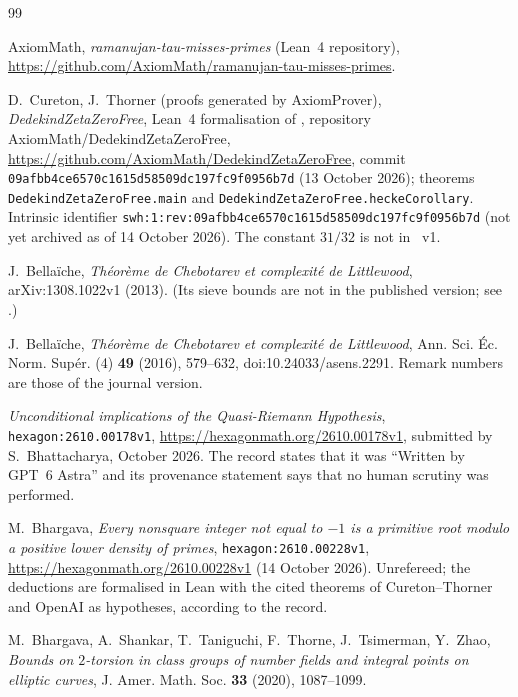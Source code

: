\documentclass[11pt]{amsart}
\theoremstyle{definition}
\theoremstyle{remark}
\begin{document}
\begin{thebibliography}{99}

AxiomMath, \emph{ramanujan-tau-misses-primes} (Lean~4 repository), \url{https://github.com/AxiomMath/ramanujan-tau-misses-primes}.

D.~Cureton, J.~Thorner (proofs generated by AxiomProver), \emph{DedekindZetaZeroFree}, Lean~4 formalisation of
\cite{CT}, repository AxiomMath/DedekindZetaZeroFree, \url{https://github.com/AxiomMath/DedekindZetaZeroFree}, commit
\texttt{09afbb4ce6570c1615d58509dc197fc9f0956b7d} (13 October 2026); theorems \texttt{DedekindZetaZeroFree.main} and
\texttt{DedekindZetaZeroFree.heckeCorollary}. Intrinsic identifier
\texttt{swh:1:rev:09afbb4ce6570c1615d58509dc197fc9f0956b7d} (not yet archived as of 14 October 2026). The constant
$31/32$ is not in \cite{CT}~v1.

J.~Bella\"iche, \emph{Th\'eor\`eme de Chebotarev et complexit\'e de Littlewood}, arXiv:1308.1022v1 (2013). (Its sieve bounds
are not in the published version; see \cite[Rem.~18(i)]{Bel16}.)

J.~Bella\"iche, \emph{Th\'eor\`eme de Chebotarev et complexit\'e de Littlewood}, Ann. Sci. \'Ec. Norm. Sup\'er. (4)
\textbf{49} (2016), 579--632, doi:10.24033/asens.2291. Remark numbers are those of the journal version.

\emph{Unconditional implications of the Quasi-Riemann Hypothesis}, \texttt{hexagon:2610.00178v1},
\url{https://hexagonmath.org/2610.00178v1}, submitted by S.~Bhattacharya, October 2026. The record states that it was
``Written by GPT~6 Astra'' and its provenance statement says that no human scrutiny was performed.

M.~Bhargava, \emph{Every nonsquare integer not equal to $-1$ is a primitive root modulo a positive lower density of
primes}, \texttt{hexagon:2610.00228v1}, \url{https://hexagonmath.org/2610.00228v1} (14 October 2026). Unrefereed; the
deductions are formalised in Lean with the cited theorems of Cureton--Thorner and OpenAI as hypotheses, according to
the record.

M.~Bhargava, A.~Shankar, T.~Taniguchi, F.~Thorne, J.~Tsimerman, Y.~Zhao, \emph{Bounds on $2$-torsion in class groups of
number fields and integral points on elliptic curves}, J. Amer. Math. Soc. \textbf{33} (2020), 1087--1099.


\end{thebibliography}
\end{document}
